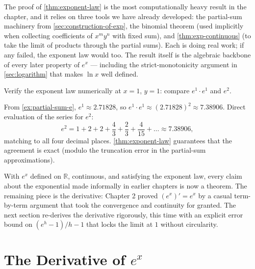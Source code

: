 \begin{caution}
The proof of \cref{thm:exponent-law} is the most computationally heavy result in the chapter, and it relies on three tools we have already developed: the partial-sum machinery from \cref{sec:construction-of-exp}, the binomial theorem (used implicitly when collecting coefficients of \(x^{m} y^{n}\) with fixed sum), and \cref{thm:exp-continuous} (to take the limit of products through the partial sums). Each is doing real work; if any failed, the exponent law would too. The result itself is the algebraic backbone of every later property of \(e^{x}\) --- including the strict-monotonicity argument in \cref{sec:logarithm} that makes \(\ln x\) well defined.
\end{caution}

\begin{workedexample}
\begin{example}\label{ex:exponent-law-numerical}
Verify the exponent law numerically at \(x = 1\), \(y = 1\): compare \(e^{1} \cdot e^{1}\) and \(e^{2}\).
\end{example}

\begin{solution}
From \cref{ex:partial-sum-e}, \(e^{1} \approx 2.71828\), so \(e^{1} \cdot e^{1} \approx (2.71828)^{2} \approx 7.38906\). Direct evaluation of the series for \(e^{2}\):
\[
e^{2} = 1 + 2 + 2 + \frac{4}{3} + \frac{2}{3} + \frac{4}{15} + \dots \approx 7.38906,
\]
matching to all four decimal places. \cref{thm:exponent-law} guarantees that the agreement is exact (modulo the truncation error in the partial-sum approximations).
\end{solution}
\end{workedexample}

With \(e^{x}\) defined on \(\mathbb{R}\), continuous, and satisfying the exponent law, every claim about the exponential made informally in earlier chapters is now a theorem. The remaining piece is the derivative: Chapter 2 proved \((e^{x})' = e^{x}\) by a casual term-by-term argument that took the convergence and continuity for granted. The next section re-derives the derivative rigorously, this time with an explicit error bound on \((e^{h} - 1)/h - 1\) that locks the limit at \(1\) without circularity.

\section{The Derivative of \texorpdfstring{$e^{x}$}{e\^{}x}}\label{sec:rigorous-derivative-of-exp}

